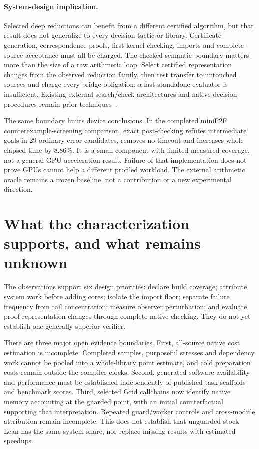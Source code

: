\documentclass[10pt,twocolumn]{article}
\begin{document}
\paragraph{System-design implication.}
Selected deep reductions can benefit from a different certified algorithm,
but that result does not generalize to every decision tactic or library.
Certificate generation, correspondence proofs, first kernel checking,
imports and complete-source acceptance must all be charged.
The checked semantic boundary matters more than the size of a raw arithmetic
loop. Select certified representation changes from the observed reduction
family, then test transfer to untouched sources and charge every bridge
obligation; a fast standalone evaluator is insufficient.
Existing external search/check architectures and native decision
procedures remain prior techniques~\cite{mathlib,lean49DecideSource}.

The same boundary limits device conclusions.
In the completed miniF2F counterexample-screening comparison, exact
post-checking refutes intermediate goals in 29 ordinary-error candidates,
removes no timeout and increases whole elapsed time by 8.86\%.
It is a small component with limited measured coverage, not a general GPU
acceleration result. Failure of that implementation does not prove GPUs
cannot help a different profiled workload.
The external arithmetic oracle remains a frozen baseline, not a contribution
or a new experimental direction.

\section{What the characterization supports, and what remains unknown}
\label{sec:limits}
The observations support six design priorities: declare build coverage;
attribute system work before adding cores; isolate the import floor;
separate failure frequency from tail concentration; measure observer
perturbation; and evaluate proof-representation changes through complete
native checking. They do not yet establish one generally superior verifier.

There are three major open evidence boundaries.
First, all-source native cost estimation is incomplete. Completed samples,
purposeful stresses and dependency work cannot be pooled into a whole-library
point estimate, and cold preparation costs remain outside the compiler
clocks. Second, generated-software availability and performance must be
established independently of published task scaffolds and benchmark scores.
Third, selected Grid callchains now identify native memory accounting
at the guarded point, with an initial counterfactual supporting that
interpretation. Repeated guard/worker controls and cross-module attribution
remain incomplete. This does not establish that unguarded stock Lean has
the same system share, nor replace missing results with estimated speedups.
\end{document}
